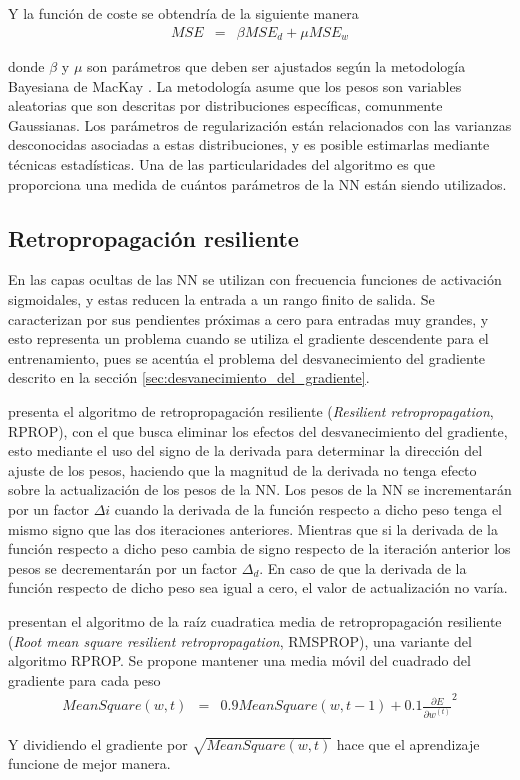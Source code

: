 Y la función de coste se obtendría de la siguiente manera
\begin{eqnarray}
	MSE &=& \beta MSE_{d} + \mu MSE_{w}
\end{eqnarray}

donde $\beta$ y $\mu$ son parámetros que deben ser ajustados según la metodología Bayesiana de MacKay \cite{MacKay1992a, MacKay1992b}. La metodología asume que los pesos son variables aleatorias que son descritas por distribuciones específicas, comunmente Gaussianas. Los parámetros de regularización están relacionados con las varianzas desconocidas asociadas a estas distribuciones, y es posible estimarlas mediante técnicas estadísticas. Una de las particularidades del algoritmo es que proporciona una medida de cuántos parámetros de la NN están siendo utilizados.

\subsection{Retropropagación resiliente}
En las capas ocultas de las NN se utilizan con frecuencia funciones de activación sigmoidales, y estas reducen la entrada a un rango finito de salida. Se caracterizan por sus pendientes próximas a cero para entradas muy grandes, y esto representa un problema cuando se utiliza el gradiente descendente para el entrenamiento, pues se acentúa el problema del desvanecimiento del gradiente descrito en la sección \ref{sec:desvanecimiento_del_gradiente}.

 presenta el algoritmo de retropropagación resiliente ({\em Resilient retropropagation}, RPROP), con el que busca eliminar los efectos del desvanecimiento del gradiente, esto mediante el uso del signo de la derivada para determinar la dirección del ajuste de los pesos, haciendo que la magnitud de la derivada no tenga efecto sobre la actualización de los pesos de la NN. Los pesos de la NN se incrementarán por un factor $\Delta{i}$ cuando la derivada de la función respecto a dicho peso tenga el mismo signo que las dos iteraciones anteriores. Mientras que si la derivada de la función respecto a dicho peso cambia de signo respecto de la iteración anterior los pesos se decrementarán por un factor $\Delta_{d}$. En caso de que la derivada de la función respecto de dicho peso sea igual a cero, el valor de actualización no varía.

 presentan el algoritmo de la raíz cuadratica media de retropropagación resiliente ({\em Root mean square resilient retropropagation}, RMSPROP), una variante  del algoritmo RPROP. Se propone mantener una media móvil del cuadrado del gradiente para cada peso
\begin{eqnarray}
	MeanSquare(w, t) &=& 0.9MeanSquare(w, t - 1) + 0.1\frac{\partial E}{\partial w^{(t)}}^{2}
\end{eqnarray}

Y dividiendo el gradiente por $\sqrt{MeanSquare(w, t)}$ hace que el aprendizaje funcione de mejor manera.

